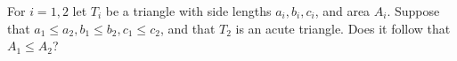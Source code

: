 For $i = 1,2$ let $T_i$ be a triangle with side lengths $a_i, b_i, c_i$,
and area $A_i$.  Suppose that $a_1 \le a_2,  b_1 \le b_2,  c_1 \le
c_2$,
and that $T_2$ is an acute triangle. Does it follow that $A_1
\le A_2$?
